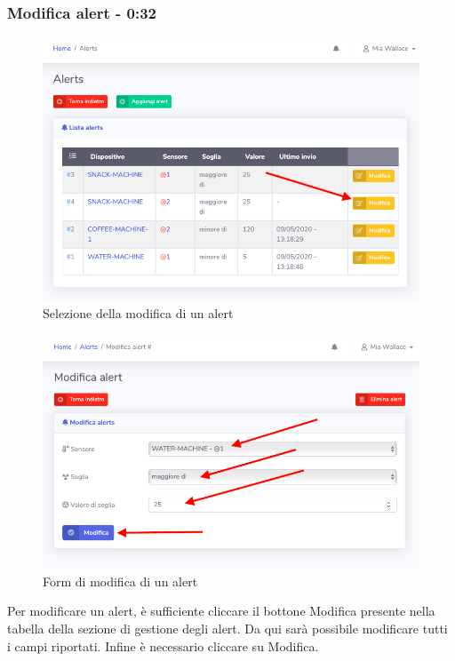 	\subsubsection{Modifica alert - 0:32}
		\begin{figure}[H]
		\centering
		\includegraphics[scale=0.600]{res/images/mod/selModAlert.png}
		\caption{Selezione della modifica di un alert}
	\end{figure}
	\begin{figure}[H]
		\centering
		\includegraphics[scale=0.600]{res/images/mod/modAlert.png}
		\caption{Form di modifica di un alert}
	\end{figure}
		Per modificare un alert, è sufficiente cliccare il bottone Modifica presente nella tabella della sezione di gestione degli alert. Da qui sarà possibile modificare tutti i campi riportati. Infine è necessario cliccare su Modifica.

